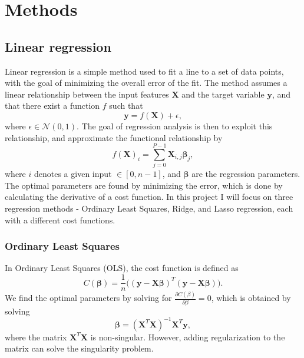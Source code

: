 \section{Methods}\label{sec:methods}
\subsection{Linear regression}\label{ssec:linear_regression}
Linear regression is a simple method used to fit a line to a set of data points, with the goal of minimizing the overall error of the fit. The method assumes a linear relationship between the input features $\mathbf{X}$ and the target variable $\mathbf{y}$, and that there exist a function $f$ such that 
\begin{equation}
    \mathbf{y} = f(\mathbf{X}) + \epsilon,
\end{equation}
where $\epsilon \in \mathcal{N}(0, 1)$. The goal of regression analysis is then to exploit this relationship, and approximate the functional relationship by 
\begin{equation}
    f(\mathbf{X})_{i} = \sum_{j=0}^{P-1}\mathbf{X}_{i, j} \mathbf{\beta}_{j} ,
\end{equation}
where $i$ denotes a given input $\in [0, n-1]$, and $\mathbf{\beta}$ are the regression parameters. The optimal parameters are found by minimizing the error, which is done by calculating the derivative of a cost function. In this project I will focus on three regression methods - Ordinary Least Squares, Ridge, and Lasso regression, each with a different cost functions.

\subsubsection{Ordinary Least Squares}\label{sssec:ols}
In Ordinary Least Squares (OLS), the cost function is defined as 
\begin{equation}\label{eq:ols_cost}
    C (\mathbf{\beta}) = \frac{1}{n} \big( (\mathbf{y} - \mathbf{X} \mathbf{\beta})^{T} (\mathbf{y} - \mathbf{X} \mathbf{\beta}) \big).
\end{equation}
We find the optimal parameters by solving for $\frac{\partial C(\beta)}{\partial \beta} = 0$, which is obtained by solving
\begin{equation}\label{eq:ols_beta}
    \mathbf{\beta} = (\mathbf{X}^{T}\mathbf{X})^{-1} \mathbf{X}^{T} \mathbf{y}, 
\end{equation}
where the matrix $\mathbf{X}^{T}\mathbf{X}$ is non-singular. However, adding regularization to the matrix can solve the singularity problem.


